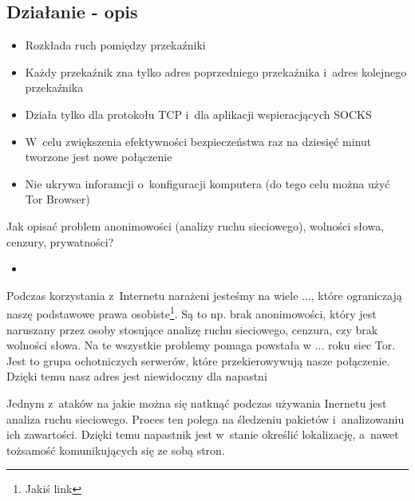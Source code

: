 \subsection{Działanie - opis}
\begin{itemize}
 \item Rozkłada ruch pomiędzy przekaźniki
 \item Każdy przekaźnik zna tylko adres poprzedniego przekaźnika i~adres kolejnego przekaźnika
 \item Działa tylko dla protokołu TCP i~dla aplikacji wspieracjących SOCKS
 \item W~celu zwiększenia efektywności bezpieczeństwa raz na dziesięć minut tworzone jest nowe połączenie
 \item Nie ukrywa inforamcji o~konfiguracji komputera (do tego celu można użyć Tor Browser)
 
\end{itemize}

Jak opisać problem anonimowości (analizy ruchu sieciowego), wolności słowa, cenzury, prywatności?
\begin{itemize}
 \item 
\end{itemize}

Podczas korzystania z~Internetu narażeni jesteśmy na wiele ..., które ograniczają naszę podstawowe prawa osobiste\footnote{Jakiś link}. Są to np. brak anonimowości, który jest naruszany przez osoby stosujące analizę ruchu sieciowego, cenzura, czy brak wolności słowa. Na te wszystkie problemy pomaga powstała w ... roku siec Tor. Jest to grupa ochotniczych serwerów, które przekierowywują nasze połączenie. Dzięki temu nasz adres jest niewidoczny dla napastni

Jednym z~ataków na jakie można się natknąć podczas używania Inernetu jest analiza ruchu sieciowego. Proces ten polega na śledzeniu pakietów i~analizowaniu ich zawartości. Dzięki temu napastnik jest w~stanie określić lokalizację, a~nawet tożsamość komunikujących się ze sobą stron.